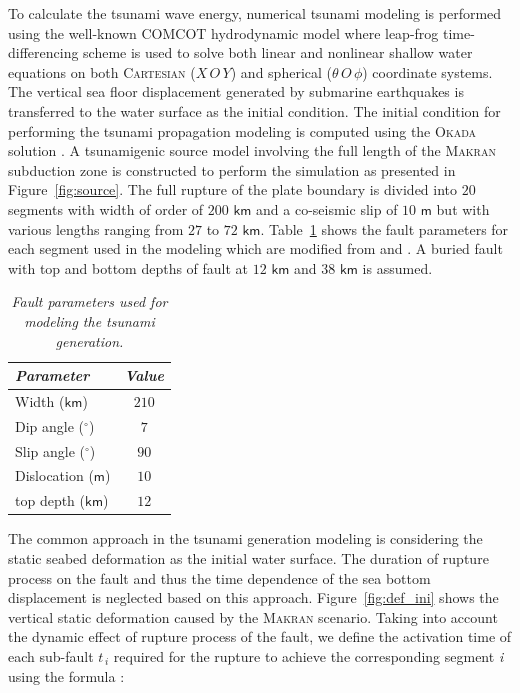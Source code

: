 \documentclass[12pt]{llncs}
\begin{document}
To calculate the tsunami wave energy, numerical tsunami modeling is performed using the well-known COMCOT hydrodynamic model \citep{Liu1998} where leap-frog time-differencing scheme is used to solve both linear and nonlinear shallow water equations on both \textsc{Cartesian} ($X\,O\,Y$) and spherical ($\theta\,O\,\phi$) coordinate systems. The vertical sea floor displacement generated by submarine earthquakes is transferred to the water surface as the initial condition. The initial condition for performing the tsunami propagation modeling is computed using the \textsc{Okada} solution \citep{Okada85}. A tsunamigenic source model involving the full length of the \textsc{Makran} subduction zone is constructed to perform the simulation as presented in Figure~\ref{fig:source}. The full rupture of the plate boundary is divided into $20$ segments with width of order of $200$ $\mathsf{km}$ and a co-seismic slip of $10$ $\mathsf{m}$ \citep{GRL:GRL50374} but with various lengths ranging from $27$ to $72$ $\mathsf{km}$. Table~\ref{table:source} shows the fault parameters for each segment used in the modeling which are modified from \cite{Okal2008} and \cite{GRL:GRL50374}. A buried fault with top and bottom depths of fault at $12$ $\mathsf{km}$ and $38$ $\mathsf{km}$ is assumed.
%
%
\begin{table}
\centering
\small
\renewcommand{\arraystretch}{1.25}
\begin{tabular}{l|c}
\hline\hline
\multicolumn{1}{l}{\textit{Parameter}} &
\multicolumn{1}{c}{\textit{Value}} \\
\hline\hline
Width ($\mathsf{km}$)\quad\quad\quad\quad\quad\quad & $210$ \\
Dip angle (${}^{\circ}$)\quad\quad\quad\quad\quad\quad & $7$  \\
Slip angle (${}^{\circ}$)\quad\quad\quad\quad\quad\quad & $90$ \\
Dislocation ($\mathsf{m}$)\quad\quad\quad\quad\quad\quad & $10$ \\
top depth ($\mathsf{km}$)\quad\quad\quad\quad\quad\quad & $12$ \\
\hline\hline
\end{tabular}
\bigskip
\normalsize
\caption{\small\em Fault parameters used for modeling the tsunami generation.}
\label{table:source}
\end{table}

The common approach in the tsunami generation modeling is considering the static seabed deformation as the initial water surface. The duration of rupture process on the fault and thus the time dependence of the sea bottom displacement is neglected based on this approach. Figure~\ref{fig:def_ini} shows the vertical static deformation caused by the \textsc{Makran} scenario. Taking into account the dynamic effect of rupture process of the fault, we define the activation time of each sub-fault $t_{\,i}$ required for the rupture to achieve the corresponding segment \textit{i} using the formula \citep{Dutykh2012a}:
\end{document}

